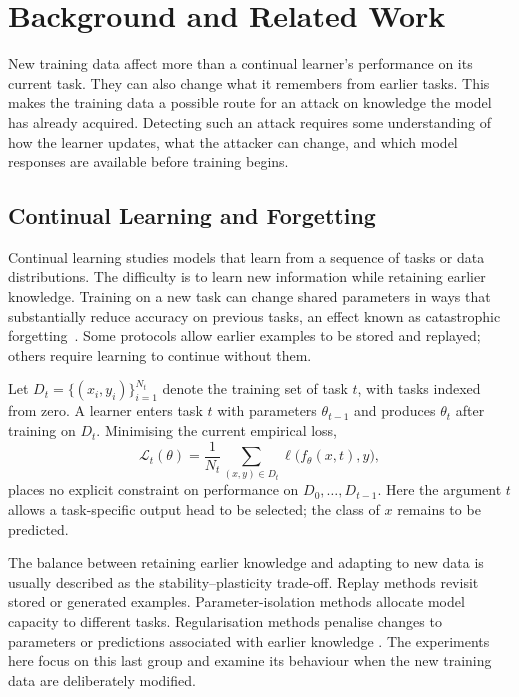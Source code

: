 \section{Background and Related Work}
\label{sec:background}

New training data affect more than a continual learner's performance on its
current task. They can also change what it remembers from earlier tasks.
This makes the training data a possible route for an attack on knowledge
the model has already acquired. Detecting such an attack requires some
understanding of how the learner updates, what the attacker can change,
and which model responses are available before training begins.

\subsection{Continual Learning and Forgetting}
\label{subsec:bg-continual-learning}

Continual learning studies models that learn from a sequence of tasks or
data distributions. The difficulty is to learn new information while
retaining earlier knowledge. Training on a new task can change shared
parameters in ways that substantially reduce accuracy on previous tasks,
an effect known as catastrophic forgetting~\cite{parisi2019continual}.
Some protocols allow earlier examples to be stored and replayed; others
require learning to continue without them.

Let $D_t=\{(x_i,y_i)\}_{i=1}^{N_t}$ denote the training set of task $t$,
with tasks indexed from zero. A learner enters task $t$ with parameters
$\theta_{t-1}$ and produces $\theta_t$ after training on $D_t$. Minimising
the current empirical loss,
\begin{equation}
    \mathcal{L}_t(\theta)
    = \frac{1}{N_t}\sum_{(x,y)\in D_t}
      \ell\bigl(f_\theta(x,t),y\bigr),
    \label{eq:bg-current-loss}
\end{equation}
places no explicit constraint on performance on $D_0,\ldots,D_{t-1}$.
Here the argument $t$ allows a task-specific output head to be selected;
the class of $x$ remains to be predicted.

The balance between retaining earlier knowledge and adapting to new data
is usually described as the stability--plasticity trade-off. Replay methods
revisit stored or generated examples. Parameter-isolation methods allocate
model capacity to different tasks. Regularisation methods penalise changes
to parameters or predictions associated with earlier knowledge
\cite{parisi2019continual}. The experiments here focus on this last group
and examine its behaviour when the new training data are deliberately
modified.

